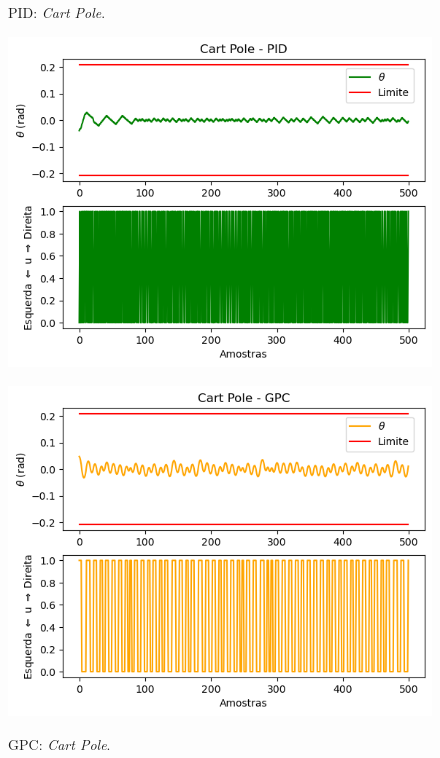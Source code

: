\documentclass[12pt,           %
a4paper,                       %
openany,                       %
oneside,                       %
chapter=TITLE,                 %
english,                       %
spanish,                       %
brazil,                        %
sumario=tradicional]{abntex2}  %
\begin{document}
\begin{OnehalfSpace}
\begin{figure}[H]
  \begin{minipage}{0.5\textwidth}
    \centering
     \caption{PID: \textit{Cart Pole}.}
     \includegraphics[scale=0.44]{ctpidio.png}
    \label{fig:imagem1}
  \end{minipage}
  \begin{minipage}{0.5\textwidth}
    \centering
     \caption{GPC: \textit{Cart Pole}.}
     \includegraphics[scale=0.44]{ctgpcio.png}
    \label{fig:imagem2}
  \end{minipage}
\end{figure}
\vspace*{-.9cm}
{\raggedright {}}


\end{OnehalfSpace}
\end{document}
